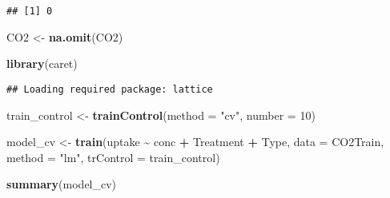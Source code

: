 \documentclass[
]{article}
\newenvironment{Shaded}{\begin{snugshade}}{\end{snugshade}}
\newcommand{\AttributeTok}[1]{\textcolor[rgb]{0.13,0.29,0.53}{#1}}
\newcommand{\ConstantTok}[1]{\textcolor[rgb]{0.56,0.35,0.01}{#1}}
\newcommand{\DecValTok}[1]{\textcolor[rgb]{0.00,0.00,0.81}{#1}}
\newcommand{\FloatTok}[1]{\textcolor[rgb]{0.00,0.00,0.81}{#1}}
\newcommand{\FunctionTok}[1]{\textcolor[rgb]{0.13,0.29,0.53}{\textbf{#1}}}
\newcommand{\NormalTok}[1]{#1}
\newcommand{\OtherTok}[1]{\textcolor[rgb]{0.56,0.35,0.01}{#1}}
\newcommand{\SpecialCharTok}[1]{\textcolor[rgb]{0.81,0.36,0.00}{\textbf{#1}}}
\newcommand{\StringTok}[1]{\textcolor[rgb]{0.31,0.60,0.02}{#1}}
\begin{document}
\begin{verbatim}
## [1] 0
\end{verbatim}

\begin{Shaded}
\begin{Highlighting}[]
\NormalTok{CO2 }\OtherTok{\textless{}{-}} \FunctionTok{na.omit}\NormalTok{(CO2)}
\end{Highlighting}
\end{Shaded}

\begin{Shaded}
\begin{Highlighting}[]
\FunctionTok{library}\NormalTok{(caret)}
\end{Highlighting}
\end{Shaded}

\begin{verbatim}
## Loading required package: lattice
\end{verbatim}

\begin{Shaded}
\end{Shaded}

\begin{Shaded}
\begin{Highlighting}[]
\NormalTok{train\_control }\OtherTok{\textless{}{-}} \FunctionTok{trainControl}\NormalTok{(}\AttributeTok{method =} \StringTok{"cv"}\NormalTok{, }\AttributeTok{number =} \DecValTok{10}\NormalTok{)}

\NormalTok{model\_cv }\OtherTok{\textless{}{-}} \FunctionTok{train}\NormalTok{(uptake }\SpecialCharTok{\textasciitilde{}}\NormalTok{ conc }\SpecialCharTok{+}\NormalTok{ Treatment }\SpecialCharTok{+}\NormalTok{ Type, }\AttributeTok{data =}\NormalTok{ CO2Train, }\AttributeTok{method =} \StringTok{"lm"}\NormalTok{, }\AttributeTok{trControl =}\NormalTok{ train\_control)}

\FunctionTok{summary}\NormalTok{(model\_cv)}
\end{Highlighting}
\end{Shaded}
\end{document}
